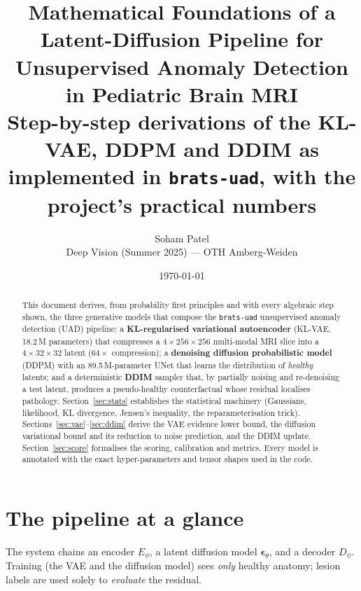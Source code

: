 \documentclass[12pt,a4paper]{article}
\title{\textbf{Mathematical Foundations of a Latent-Diffusion Pipeline for\\
Unsupervised Anomaly Detection in Pediatric Brain MRI}\\[3pt]
\large Step-by-step derivations of the KL-VAE, DDPM and DDIM as implemented in
\texttt{brats-uad}, with the project's practical numbers}
\author{Soham Patel \\ \small Deep Vision (Summer 2025) --- OTH Amberg-Weiden}
\date{\today}
\theoremstyle{definition}
\theoremstyle{plain}
\newcommand{\eps}{\bm{\epsilon}}
\begin{document}
\maketitle
{\small\tableofcontents}
\bigskip

\begin{abstract}
\noindent This document derives, from probability first principles and with every
algebraic step shown, the three generative models that compose the
\texttt{brats-uad} unsupervised anomaly detection (UAD) pipeline: a
\textbf{KL-regularised variational autoencoder} (KL-VAE, 18.2\,M parameters) that
compresses a $4{\times}256{\times}256$ multi-modal MRI slice into a
$4{\times}32{\times}32$ latent ($64\times$ compression); a
\textbf{denoising diffusion probabilistic model} (DDPM) with an 89.5\,M-parameter
UNet that learns the distribution of \emph{healthy} latents; and a deterministic
\textbf{DDIM} sampler that, by partially noising and re-denoising a test latent,
produces a pseudo-healthy counterfactual whose residual localises pathology.
Section~\ref{sec:stats} establishes the statistical machinery (Gaussians,
likelihood, KL divergence, Jensen's inequality, the reparameterisation trick).
Sections~\ref{sec:vae}--\ref{sec:ddim} derive the VAE evidence lower bound, the
diffusion variational bound and its reduction to noise prediction, and the DDIM
update. Section~\ref{sec:score} formalises the scoring, calibration and metrics.
Every model is annotated with the exact hyper-parameters and tensor shapes used
in the code.
\end{abstract}

\section{The pipeline at a glance}
The system chains an encoder $E_\phi$, a latent diffusion model $\eps_\theta$, and
a decoder $D_\psi$. Training (the VAE and the diffusion model) sees \emph{only}
healthy anatomy; lesion labels are used solely to \emph{evaluate} the residual.
\end{document}
